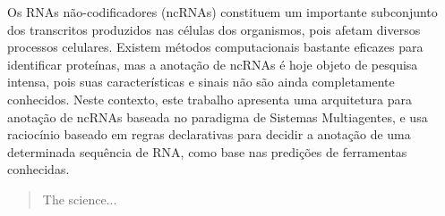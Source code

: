 \documentclass[doutorado]{unb-cic}
\begin{document}

  \begin{resumo}
  
	Os RNAs não-codificadores (ncRNAs) constituem um importante subconjunto dos transcritos  produzidos nas células dos organismos, pois afetam diversos processos celulares. Existem métodos computacionais  bastante eficazes  para  identificar proteínas, mas  a anotação  de ncRNAs é hoje objeto de pesquisa intensa, pois  suas características e sinais  não são ainda  completamente  conhecidos. Neste contexto, este trabalho apresenta uma arquitetura para anotação de ncRNAs baseada no paradigma de Sistemas Multiagentes, e usa raciocínio baseado em regras declarativas para decidir a anotação de uma determinada sequência de RNA, como base nas predições de ferramentas conhecidas.  
	
 \end{resumo}

  
  \begin{abstract}
  The science...
  \end{abstract}


  \tableofcontents
  \listoffigures
  \listoftables

  \textual
  






 
  \postextual
  
  
\end{document}
